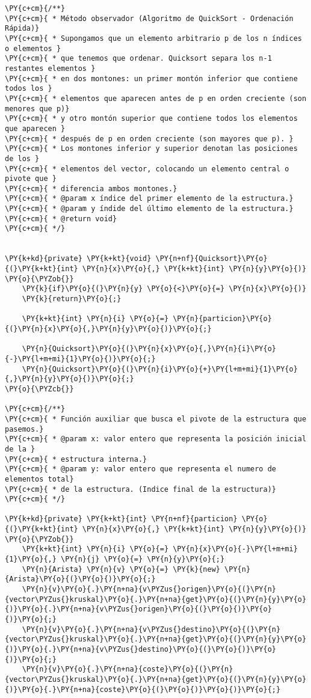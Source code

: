 \begin{Verbatim}[commandchars=\\\{\}]
\PY{c+cm}{/**}
\PY{c+cm}{ * Método observador (Algoritmo de QuickSort - Ordenación Rápida)}
\PY{c+cm}{ * Supongamos que un elemento arbitrario p de los n índices o elementos }
\PY{c+cm}{ * que tenemos que ordenar. Quicksort separa los n-1 restantes elementos }
\PY{c+cm}{ * en dos montones: un primer montón inferior que contiene todos los }
\PY{c+cm}{ * elementos que aparecen antes de p en orden creciente (son menores que p)}
\PY{c+cm}{ * y otro montón superior que contiene todos los elementos que aparecen }
\PY{c+cm}{ * después de p en orden creciente (son mayores que p). }
\PY{c+cm}{ * Los montones inferior y superior denotan las posiciones de los }
\PY{c+cm}{ * elementos del vector, colocando un elemento central o pivote que }
\PY{c+cm}{ * diferencia ambos montones.}
\PY{c+cm}{ * @param x índice del primer elemento de la estructura.}
\PY{c+cm}{ * @param y índide del último elemento de la estructura.}
\PY{c+cm}{ * @return void}
\PY{c+cm}{ */}


\PY{k+kd}{private} \PY{k+kt}{void} \PY{n+nf}{Quicksort}\PY{o}{(}\PY{k+kt}{int} \PY{n}{x}\PY{o}{,} \PY{k+kt}{int} \PY{n}{y}\PY{o}{)}
\PY{o}{\PYZob{}}
    \PY{k}{if}\PY{o}{(}\PY{n}{y} \PY{o}{<}\PY{o}{=} \PY{n}{x}\PY{o}{)}
	\PY{k}{return}\PY{o}{;}

    \PY{k+kt}{int} \PY{n}{i} \PY{o}{=} \PY{n}{particion}\PY{o}{(}\PY{n}{x}\PY{o}{,}\PY{n}{y}\PY{o}{)}\PY{o}{;}

    \PY{n}{Quicksort}\PY{o}{(}\PY{n}{x}\PY{o}{,}\PY{n}{i}\PY{o}{-}\PY{l+m+mi}{1}\PY{o}{)}\PY{o}{;}
    \PY{n}{Quicksort}\PY{o}{(}\PY{n}{i}\PY{o}{+}\PY{l+m+mi}{1}\PY{o}{,}\PY{n}{y}\PY{o}{)}\PY{o}{;}
\PY{o}{\PYZcb{}}

\PY{c+cm}{/**}
\PY{c+cm}{ * Función auxiliar que busca el pivote de la estructura que pasemos.}
\PY{c+cm}{ * @param x: valor entero que representa la posición inicial de la }
\PY{c+cm}{ * estructura interna.}
\PY{c+cm}{ * @param y: valor entero que representa el numero de elementos total}
\PY{c+cm}{ * de la estructura. (Indice final de la estructura)}
\PY{c+cm}{ */}

\PY{k+kd}{private} \PY{k+kt}{int} \PY{n+nf}{particion} \PY{o}{(}\PY{k+kt}{int} \PY{n}{x}\PY{o}{,} \PY{k+kt}{int} \PY{n}{y}\PY{o}{)}
\PY{o}{\PYZob{}}
    \PY{k+kt}{int} \PY{n}{i} \PY{o}{=} \PY{n}{x}\PY{o}{-}\PY{l+m+mi}{1}\PY{o}{,} \PY{n}{j} \PY{o}{=} \PY{n}{y}\PY{o}{;}
    \PY{n}{Arista} \PY{n}{v} \PY{o}{=} \PY{k}{new} \PY{n}{Arista}\PY{o}{(}\PY{o}{)}\PY{o}{;}
    \PY{n}{v}\PY{o}{.}\PY{n+na}{v\PYZus{}origen}\PY{o}{(}\PY{n}{vector\PYZus{}kruskal}\PY{o}{.}\PY{n+na}{get}\PY{o}{(}\PY{n}{y}\PY{o}{)}\PY{o}{.}\PY{n+na}{v\PYZus{}origen}\PY{o}{(}\PY{o}{)}\PY{o}{)}\PY{o}{;}
    \PY{n}{v}\PY{o}{.}\PY{n+na}{v\PYZus{}destino}\PY{o}{(}\PY{n}{vector\PYZus{}kruskal}\PY{o}{.}\PY{n+na}{get}\PY{o}{(}\PY{n}{y}\PY{o}{)}\PY{o}{.}\PY{n+na}{v\PYZus{}destino}\PY{o}{(}\PY{o}{)}\PY{o}{)}\PY{o}{;}
    \PY{n}{v}\PY{o}{.}\PY{n+na}{coste}\PY{o}{(}\PY{n}{vector\PYZus{}kruskal}\PY{o}{.}\PY{n+na}{get}\PY{o}{(}\PY{n}{y}\PY{o}{)}\PY{o}{.}\PY{n+na}{coste}\PY{o}{(}\PY{o}{)}\PY{o}{)}\PY{o}{;}


\end{Verbatim}
